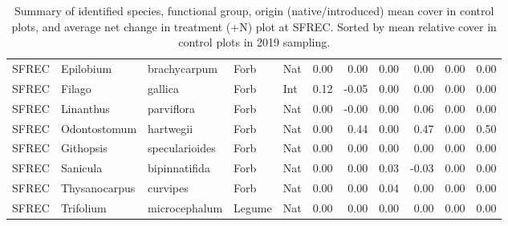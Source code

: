 \documentclass[twoside,12pt,final]{ucthesis-CA2012}
\begin{document}
\begin{ucmainmatter}
\begin{table}[ht]
{\begin{tabular}{lllllrrrrrr}
  SFREC & Epilobium & brachycarpum & Forb & Nat & 0.00 & 0.00 & 0.00 & 0.00 & 0.00 & 0.00 \\ 
  SFREC & Filago & gallica & Forb & Int & 0.12 & -0.05 & 0.00 & 0.00 & 0.00 & 0.00 \\ 
  SFREC & Linanthus & parviflora & Forb & Nat & 0.00 & -0.00 & 0.00 & 0.06 & 0.00 & 0.00 \\ 
  SFREC & Odontostomum & hartwegii & Forb & Nat & 0.00 & 0.44 & 0.00 & 0.47 & 0.00 & 0.50 \\ 
  SFREC & Githopsis & specularioides & Forb & Nat & 0.00 & 0.00 & 0.00 & 0.00 & 0.00 & 0.00 \\ 
  SFREC & Sanicula & bipinnatifida & Forb & Nat & 0.00 & 0.00 & 0.03 & -0.03 & 0.00 & 0.00 \\ 
  SFREC & Thysanocarpus & curvipes & Forb & Nat & 0.00 & 0.00 & 0.04 & 0.00 & 0.00 & 0.00 \\ 
  SFREC & Trifolium & microcephalum & Legume & Nat & 0.00 & 0.00 & 0.00 & 0.00 & 0.00 & 0.00 \\ 
   \hline
\end{tabular}
}
\caption{Summary of identified species, functional group, origin (native/introduced) mean cover in control plots, and average net change in treatment (+N) plot at SFREC. Sorted by mean relative cover in control plots in 2019 sampling.} 
\end{table}
\hypertarget{chapter-3-supporting-information}{%
}
\end{ucmainmatter}
\end{document}
